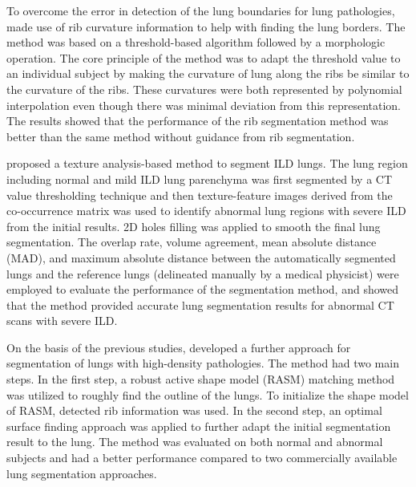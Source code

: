 To overcome the error in detection of the lung boundaries for lung pathologies, \cite{prasad2008automatic} made use of rib curvature information to help with finding the lung borders. The method was based on a threshold-based algorithm followed by a morphologic operation. The core principle of the method was to adapt the threshold value to an individual subject by making the curvature of lung along the ribs be similar to the curvature of the ribs. These curvatures were both represented by polynomial interpolation even though there was minimal deviation from this representation. The results showed that the performance of the rib segmentation method was better than the same method without guidance from rib segmentation.

\cite{wang2009automated} proposed a texture analysis-based method to segment ILD lungs. The lung region including normal and mild ILD lung parenchyma was first segmented by a CT value thresholding technique and then texture-feature images derived from the co-occurrence matrix was used to identify abnormal lung regions with severe ILD from the initial results. 2D holes filling was applied to smooth the final lung segmentation. The overlap rate, volume agreement, mean absolute distance (MAD), and maximum absolute distance between the automatically segmented lungs and the reference lungs (delineated manually by a medical physicist) were employed to evaluate the performance of the segmentation method, and showed that the method provided accurate lung segmentation results for abnormal CT scans with severe ILD.

On the basis of the previous studies, \citep{sun2012automated} developed a further approach for segmentation of lungs with high-density pathologies. The method had two main steps. In the first step, a robust active shape model (RASM) matching method was utilized to roughly find the outline of the lungs. To initialize the shape model of RASM, detected rib information was used. In the second step, an optimal surface finding approach was applied to further adapt the initial segmentation result to the lung. The method was evaluated on both normal and abnormal subjects and had a better performance compared to two commercially available lung segmentation approaches.
